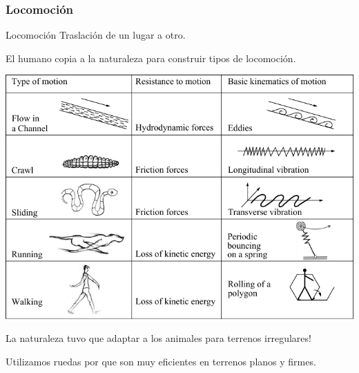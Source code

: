 
\begin{frame}
    \frametitle{Locomoción}
    \small

    \begin{block}{Locomoción}
        Traslación de un lugar a otro.
    \end{block}

    El humano copia a la naturaleza para construir tipos de locomoción.

    \begin{center}
        \includegraphics[width=0.7\columnwidth]{images/biological_locomotion_systems.pdf}
    \end{center}

    La naturaleza tuvo que adaptar a los animales para terrenos irregulares!


    Utilizamos ruedas por que son muy eficientes en terrenos planos y firmes.
\end{frame}


